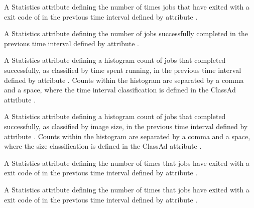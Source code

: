 \begin{description}
\item[\AdAttr{RecentJobsCheckpointed}:] A Statistics attribute defining
  the number of times jobs that have exited 
  with a  exit code of 
  in the previous time interval defined by attribute .

\item[\AdAttr{RecentJobsCompleted}:] A Statistics attribute defining
  the number of jobs successfully completed
  in the previous time interval defined by attribute .

\item[\AdAttr{RecentJobsCompletedRuntimes}:] A Statistics attribute defining
  a histogram count of jobs that completed successfully, 
  as classified by time spent running,
  in the previous time interval defined by attribute .
  Counts within the histogram are separated by a comma and a space,
  where the time interval classification is defined in the ClassAd attribute
  .

\item[\AdAttr{RecentJobsCompletedSizes}:] A Statistics attribute defining
  a histogram count of jobs that completed successfully,
  as classified by image size,
  in the previous time interval defined by attribute .
  Counts within the histogram are separated by a comma and a space, 
  where the size classification is defined in the ClassAd attribute
  .

\item[\AdAttr{RecentJobsCoredumped}:] A Statistics attribute defining
  the number of times that jobs have exited 
  with a  exit code of  
  in the previous time interval defined by attribute .

\item[\AdAttr{RecentJobsDebugLogError}:] A Statistics attribute defining
  the number of times that jobs have exited 
  with a  exit code of  
  in the previous time interval defined by attribute .


\end{description}

